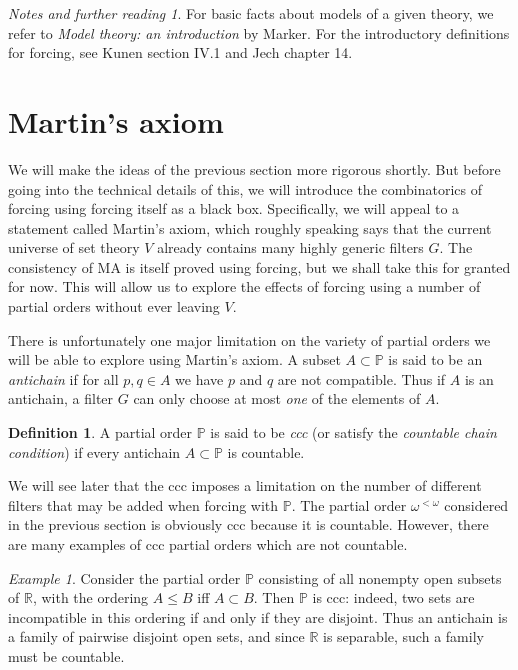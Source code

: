 \documentclass[11pt,oneside,a4paper]{amsbook}
\newcommand{\R}{\mathbb R}
\newcommand{\PP}{\mathbb P}
\theoremstyle{definition}
\theoremstyle{plain}
\theoremstyle{definition}
\newtheorem{definition}[theorem]{Definition}
\theoremstyle{remark}
\newtheorem{example}[theorem]{Example}
\newtheorem*{notes}{Notes and further reading}
\numberwithin{equation}{section}
\numberwithin{figure}{section}
\begin{document}
\begin{notes}
  For basic facts about models of a given theory, we refer to \emph{Model theory: an introduction} by Marker. For the introductory definitions for forcing, see Kunen section IV.1 and Jech chapter 14.
\end{notes}


\newpage
\section{Martin's axiom}

We will make the ideas of the previous section more rigorous shortly. But before going into the technical details of this, we will introduce the combinatorics of forcing using forcing itself as a black box. Specifically, we will appeal to a statement called Martin's axiom, which roughly speaking says that the current universe of set theory $V$ already contains many highly generic filters $G$. The consistency of MA is itself proved using forcing, but we shall take this for granted for now. This will allow us to explore the effects of forcing using a number of partial orders without ever leaving $V$.

There is unfortunately one major limitation on the variety of partial orders we will be able to explore using Martin's axiom. A subset $A\subset\PP$ is said to be an \emph{antichain} if for all $p,q\in A$ we have $p$ and $q$ are not compatible. Thus if $A$ is an antichain, a filter $G$ can only choose at most \emph{one} of the elements of $A$.

\begin{definition}
  A partial order $\PP$ is said to be \emph{ccc} (or satisfy the \emph{countable chain condition}) if every antichain $A\subset\PP$ is countable.
\end{definition}

We will see later that the ccc imposes a limitation on the number of different filters that may be added when forcing with $\PP$. The partial order $\omega^{<\omega}$ considered in the previous section is obviously ccc because it is countable. However, there are many examples of ccc partial orders which are not countable.

\begin{example}
  \label{ex:cohen-ccc}
  Consider the partial order $\PP$ consisting of all nonempty open subsets of $\R$, with the ordering $A\leq B$ iff $A\subset B$. Then $\PP$ is ccc: indeed, two sets are incompatible in this ordering if and only if they are disjoint. Thus an antichain is a family of pairwise disjoint open sets, and since $\R$ is separable, such a family must be countable.
\end{example}
\end{document}
